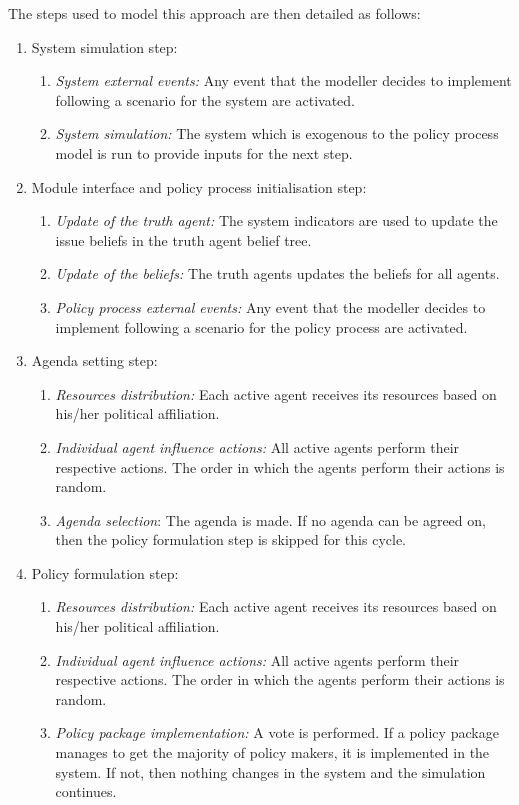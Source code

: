 \documentclass[11pt]{article}
\begin{document}
The steps used to model this approach are then detailed as follows:

\begin{enumerate}
\item System simulation step:
	\begin{enumerate}
	\item \emph{System external events:} Any event that the modeller decides to implement following a scenario for the system are activated.
	\item \emph{System simulation:} The system which is exogenous to the policy process model is run to provide inputs for the next step.
	\end{enumerate}
	
\item Module interface and policy process initialisation step:
	\begin{enumerate}
	\item \emph{Update of the truth agent:} The system indicators are used to update the issue beliefs in the truth agent belief tree.
	\item \emph{Update of the beliefs:} The truth agents updates the beliefs for all agents.
	\item \emph{Policy process external events:} Any event that the modeller decides to implement following a scenario for the policy process are activated.
	\end{enumerate}
	
\item Agenda setting step:
	\begin{enumerate}
	\item \emph{Resources distribution:} Each active agent receives its resources based on his/her political affiliation.
	\item \emph{Individual agent influence actions:} All active agents perform their respective actions. The order in which the agents perform their actions is random.
	\item \emph{Agenda selection}: The agenda is made. If no agenda can be agreed on, then the policy formulation step is skipped for this cycle.
	\end{enumerate}
	
\item Policy formulation step:
	\begin{enumerate}
	\item \emph{Resources distribution:} Each active agent receives its resources based on his/her political affiliation.
	\item \emph{Individual agent influence actions:} All active agents perform their respective actions. The order in which the agents perform their actions is random.
	\item \emph{Policy package implementation:} A vote is performed. If a policy package manages to get the majority of policy makers, it is implemented in the system. If not, then nothing changes in the system and the simulation continues.
	\end{enumerate}
	

\end{enumerate}
\end{document}
